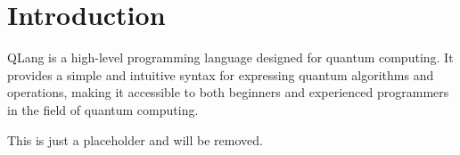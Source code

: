 \section*{Introduction}

QLang is a high-level programming language designed for quantum computing. 
It provides a simple and intuitive syntax for expressing quantum algorithms and operations, 
making it accessible to both beginners and experienced programmers in the field of quantum computing.

This is just a placeholder and will be removed.
